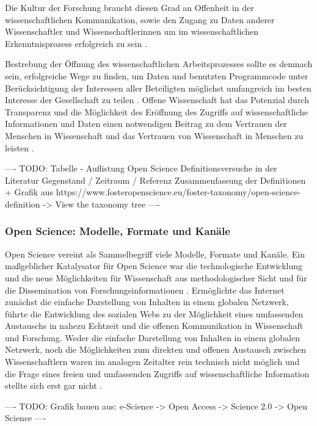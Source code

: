 Die Kultur der Forschung braucht diesen Grad an Offenheit in der wissenschaftlichen Kommunikation, sowie den Zugang zu Daten anderer Wissenschaftler und Wissenschaftlerinnen um im wissenschaftlichen Erkenntnisprozess erfolgreich zu sein \cite{Fecher_2015} \cite{Krumholz_2014} \cite{patlak_2010_open}.

Bestrebung der Öffnung des wissenschaftlichen Arbeitsprozesses sollte es demnach sein, erfolgreiche Wege zu finden, um Daten und benutzten Programmcode unter Berücksichtigung der Interessen aller Beteiligten möglichst umfangreich im besten Interesse der Gesellschaft zu teilen \cite{naeder_2010_open} \cite{Ross_2013} \cite{hey_2015_open}. Offene Wissenschaft hat das Potenzial durch Transparenz und die Möglichkeit des Eröffnung des Zugriffs auf wissenschaftliche Informationen und Daten einen notwendigen Beitrag zu dem Vertrauen der Menschen in Wissenschaft und das Vertrauen von Wissenschaft in Menschen zu leisten \cite{grand_2012_open}.

---- TODO: Tabelle - Auflistung Open Science Definitionsversuche in der Literatur Gegenstand / Zeitraum / Referenz Zusammenfassung der Definitionen + Grafik aus https://www.fosteropenscience.eu/foster-taxonomy/open-science-definition -> View the taxonomy tree ----

\subsubsection{Open Science: Modelle, Formate und Kanäle}

Open Science vereint als Sammelbegriff viele Modelle, Formate und Kanäle. Ein maßgeblicher Katalysator für Open Science war die technologische Entwicklung und die neue Möglichkeiten für Wissenschaft aus methodologischer Sicht und für die Dissemination von Forschungsinformationen \cite{garcia_2010_open}. Ermöglichte das Internet zunächst die einfache Darstellung von Inhalten in einem globalen Netzwerk, führte die Entwicklung des sozialen Webs zu der Möglichkeit eines umfassenden Austauschs in nahezu Echtzeit und die offenen Kommunikation in Wissenschaft und Forschung. Weder die einfache Darstellung von Inhalten in einem globalen Netzwerk, noch die Möglichkeiten zum direkten und offenen Austausch zwischen Wissenschaftlern waren im analogen Zeitalter rein technisch nicht möglich und die Frage eines freien und umfassenden Zugriffs auf wissenschaftliche Information stellte sich erst gar nicht \cite{Schirmbacher_oa_2007}.

---- TODO: Grafik bauen aus: e-Science -> Open Access -> Science 2.0 -> Open Science ----

